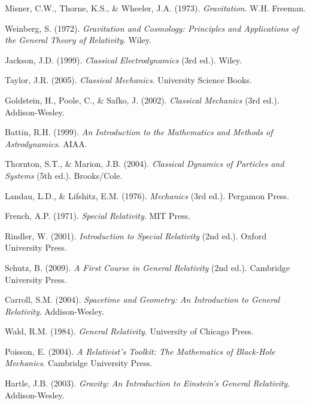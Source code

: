 \documentclass[11pt,a4paper]{article}
\theoremstyle{remark}
\begin{document}

\begin{thebibliography}{99}

Misner, C.W., Thorne, K.S., \& Wheeler, J.A. (1973). \textit{Gravitation}. W.H. Freeman.

Weinberg, S. (1972). \textit{Gravitation and Cosmology: Principles and Applications of the General Theory of Relativity}. Wiley.

Jackson, J.D. (1999). \textit{Classical Electrodynamics} (3rd ed.). Wiley.

Taylor, J.R. (2005). \textit{Classical Mechanics}. University Science Books.

Goldstein, H., Poole, C., \& Safko, J. (2002). \textit{Classical Mechanics} (3rd ed.). Addison-Wesley.

Battin, R.H. (1999). \textit{An Introduction to the Mathematics and Methods of Astrodynamics}. AIAA.

Thornton, S.T., \& Marion, J.B. (2004). \textit{Classical Dynamics of Particles and Systems} (5th ed.). Brooks/Cole.

Landau, L.D., \& Lifshitz, E.M. (1976). \textit{Mechanics} (3rd ed.). Pergamon Press.

French, A.P. (1971). \textit{Special Relativity}. MIT Press.

Rindler, W. (2001). \textit{Introduction to Special Relativity} (2nd ed.). Oxford University Press.

Schutz, B. (2009). \textit{A First Course in General Relativity} (2nd ed.). Cambridge University Press.

Carroll, S.M. (2004). \textit{Spacetime and Geometry: An Introduction to General Relativity}. Addison-Wesley.

Wald, R.M. (1984). \textit{General Relativity}. University of Chicago Press.

Poisson, E. (2004). \textit{A Relativist's Toolkit: The Mathematics of Black-Hole Mechanics}. Cambridge University Press.

Hartle, J.B. (2003). \textit{Gravity: An Introduction to Einstein's General Relativity}. Addison-Wesley.


\end{thebibliography}
\end{document}
